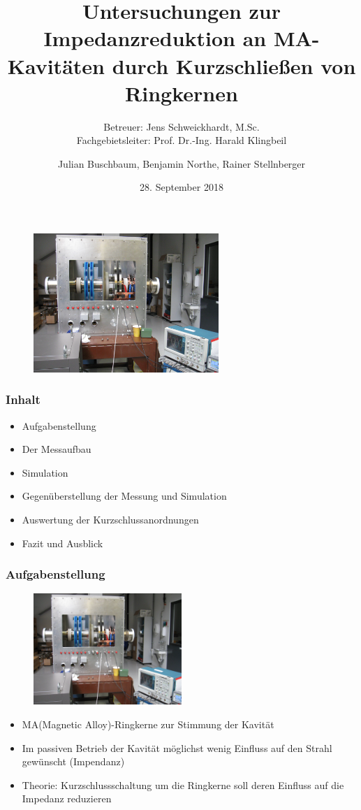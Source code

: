 \documentclass[accentcolor=tud9b, colorbacktitle, inverttitle]{tudbeamer}
\author{Julian Buschbaum, Benjamin Northe, Rainer Stellnberger}
\institute{Institut TEMF~\textbar~Fachgebiet Beschleunigertechnik}
\date{28. September 2018}
\title{Untersuchungen zur Impedanzreduktion an MA-Kavitäten durch Kurzschließen von Ringkernen \vspace{0.2em}}
\subtitle{Betreuer: Jens Schweickhardt, M.Sc.\\ Fachgebietsleiter: Prof. Dr.-Ing. Harald Klingbeil}
\begin{document}
\begin{titleframe}
\vspace{-1em}
	\begin{figure}[h]
		\centering
		\includegraphics[width=0.625\textwidth]{Kavitaet}
	\end{figure}
\end{titleframe}





\begin{frame}\frametitle{Inhalt}
	\begin{itemize}
		\item Aufgabenstellung
		\item Der Messaufbau
		\item Simulation
		\item Gegen\"uberstellung der Messung und Simulation
		\item Auswertung der Kurzschlussanordnungen
		\item Fazit und Ausblick
	\end{itemize}
\end{frame}


\begin{frame}\frametitle{Aufgabenstellung}
\vspace{-1em}
\begin{multicols}{2}
	\begin{figure}[h]
		\centering
		\includegraphics[width=0.5\textwidth]{Kavitaet}
	\end{figure}
	\vfill\null
	\columnbreak
	\begin{itemize}
		\item MA(Magnetic Alloy)-Ringkerne zur Stimmung der Kavit\"at
		\item Im passiven Betrieb der Kavit\"at m\"oglichst wenig Einfluss auf den Strahl gewünscht (Impendanz)
		\item Theorie: Kurzschlussschaltung um die Ringkerne soll deren Einfluss auf die Impedanz reduzieren
	\end{itemize}
\end{multicols}
\end{frame}
\end{document}
